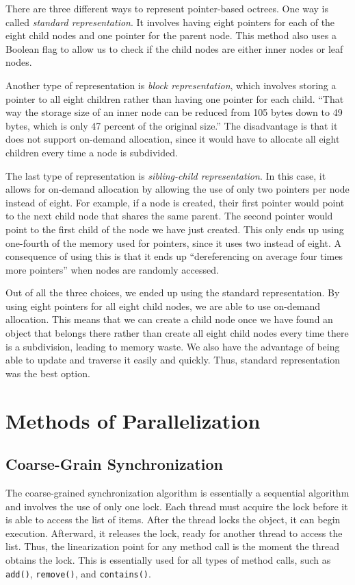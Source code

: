 \documentclass[conference]{IEEEtran}
\begin{document}
There are three different ways to represent pointer-based octrees. One way is called \textit{standard representation}. It involves having eight pointers for each of the eight child nodes and one pointer for the parent node. This method also uses a Boolean flag to allow us to check if the child nodes are either inner nodes or leaf nodes.

Another type of representation is \textit{block representation}, which involves storing a pointer to all eight children rather than having one pointer for each child. “That way the storage size of an inner node can be reduced from 105 bytes down to 49 bytes, which is only 47 percent of the original size.” \cite{octrees2} The disadvantage is that it does not support on-demand allocation, since it would have to allocate all eight children every time a node is subdivided. 

The last type of representation is \textit{sibling-child representation}. In this case, it allows for on-demand allocation by allowing the use of only two pointers per node instead of eight. For example, if a node is created, their first pointer would point to the next child node that shares the same parent. The second pointer would point to the first child of the node we have just created. This only ends up using one-fourth of the memory used for pointers, since it uses two instead of eight. A consequence of using this is that it ends up “dereferencing on average four times more pointers” \cite{octrees2} when nodes are randomly accessed. 

Out of all the three choices, we ended up using the standard representation. By using eight pointers for all eight child nodes, we are able to use on-demand allocation. This means that we can create a child node once we have found an object that belongs there rather than create all eight child nodes every time there is a subdivision, leading to memory waste. We also have the advantage of being able to update and traverse it easily and quickly. Thus, standard representation was the best option.


\section{Methods of Parallelization}

\subsection{Coarse-Grain Synchronization}
The coarse-grained synchronization algorithm is essentially a sequential algorithm and involves the use of only one lock. Each thread must acquire the lock before it is able to access the list of items. After the thread locks the object, it can begin execution. Afterward, it releases the lock, ready for another thread to access the list. Thus, the linearization point for any method call is the moment the thread obtains the lock. This is essentially used for all types of method calls, such as \verb|add()|, \verb|remove()|, and \verb|contains()|. \cite{textbook}
\end{document}
